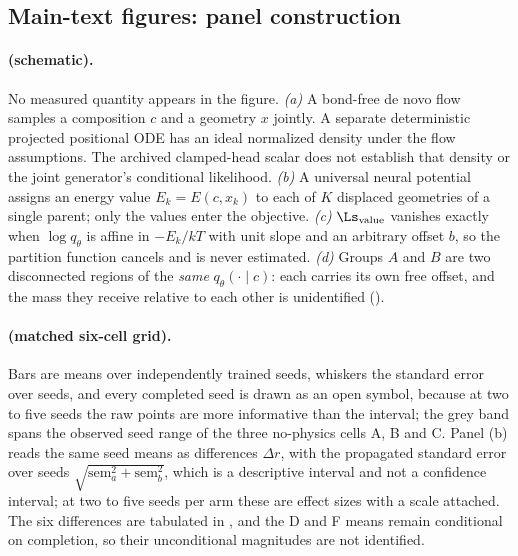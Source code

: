 \subsection{Main-text figures: panel construction}
\label{app:figdetail}

\paragraph{ (schematic).} No measured quantity appears in the
figure. \emph{(a)} A bond-free de novo flow samples a composition $c$ and a geometry
$x$ jointly. A separate deterministic projected positional ODE has an ideal
normalized density under the flow assumptions. The archived clamped-head scalar
does not establish that density or the joint generator's conditional likelihood.
\emph{(b)} A universal neural potential assigns an energy value $E_k = E(c,x_k)$ to
each of $K$ displaced geometries of a single parent; only the values enter the
objective. \emph{(c)} $\Ls_{\mathrm{value}}$ vanishes exactly when $\log q_\theta$ is
affine in $-E_k/kT$ with unit slope and an arbitrary offset $b$, so the partition
function cancels and is never estimated. \emph{(d)} Groups $A$ and $B$ are two
disconnected regions of the \emph{same} $q_\theta(\cdot \mid c)$: each carries its own
free offset, and the mass they receive relative to each other is unidentified
().

\paragraph{ (matched six-cell grid).} Bars are means over
independently trained seeds, whiskers the standard error over seeds, and every
completed seed is drawn as an open symbol, because at two to five seeds the raw
points are more informative than the interval; the grey band spans the observed seed
range of the three no-physics cells A, B and C. Panel (b) reads the same seed means as differences $\Delta r$, with
the propagated standard error over seeds
$\sqrt{\mathrm{sem}_a^2 + \mathrm{sem}_b^2}$, which is a descriptive interval and not a
confidence interval; at two to five seeds per arm these are effect sizes with a scale
attached. The six differences are tabulated in , and the D and F
means remain conditional on completion, so their unconditional magnitudes are not
identified.

